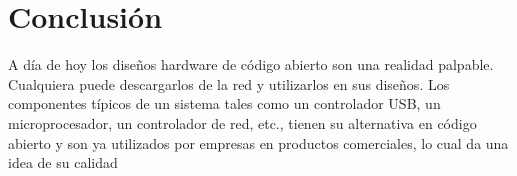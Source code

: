 \section{Conclusión}

A día de hoy los diseños hardware de código abierto son una realidad palpable. Cualquiera puede descargarlos de la red y utilizarlos en sus diseños. Los componentes típicos de un sistema tales como un controlador USB, un microprocesador, un controlador de red, etc., tienen su alternativa en código abierto y son ya utilizados por empresas en productos comerciales, lo cual da una idea de su calidad




\begin{figure}[h!]
 \begin{center}
  \label{fig:esquema}
 \end{center}
\end{figure}





